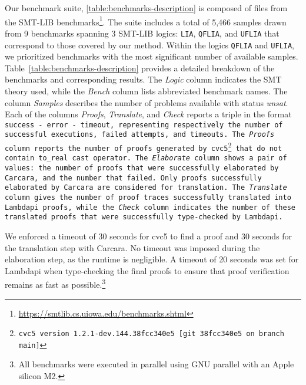 Our benchmark suite, \cref{table:benchmarks-description} is composed of files from the SMT-LIB benchmarks\footnote{\url{https://smtlib.cs.uiowa.edu/benchmarks.shtml}}.
The suite includes a total of 5,466 samples drawn from 9 benchmarks spanning 3 SMT-LIB logics: \texttt{LIA}, \texttt{QFLIA}, and \texttt{UFLIA} that correspond to those covered by our method.
Within the logics \texttt{QFLIA} and \texttt{UFLIA}, we prioritized benchmarks with the most significant number of available samples.
Table~\ref{table:benchmarks-description} provides a detailed breakdown of the benchmarks and corresponding results.
The \emph{Logic} column indicates the SMT theory used, while the \emph{Bench} column lists abbreviated benchmark names.
The column \emph{Samples} describes the number of problems available with status \emph{unsat}. 
Each of the columns \emph{Proofs}, \emph{Translate}, and \emph{Check} reports a triple in the format \tt{success - error - timeout}, representing respectively the number of successful executions, failed attempts, and timeouts. 
The \emph{Proofs} column reports the number of proofs generated by cvc5\footnote{cvc5 version 1.2.1-dev.144.38fcc340e5 [git 38fcc340e5 on branch main]} that do not contain \lstinline[language=SMT,basicstyle=\ttfamily\footnotesize]|to_real| cast operator.
The \emph{Elaborate} column shows a pair of values: the number of proofs that were successfully elaborated by Carcara, and the number that failed. Only proofs successfully elaborated by Carcara are considered for translation.
The \emph{Translate} column gives the number of proof traces successfully translated into Lambdapi proofs, while the \emph{Check} column indicates the number of these translated proofs that were successfully type-checked by Lambdapi. 

We enforced a timeout of 30 seconds for cvc5 to find a proof and 30 seconds for the translation step with Carcara.
No timeout was imposed during the elaboration step, as the runtime is negligible.
A timeout of 20 seconds was set for Lambdapi when type-checking the final proofs to ensure that proof verification remains as fast as possible.\footnote{All benchmarks were executed in parallel using GNU parallel \cite{tange_2025_15071920} with an Apple silicon M2.} %

